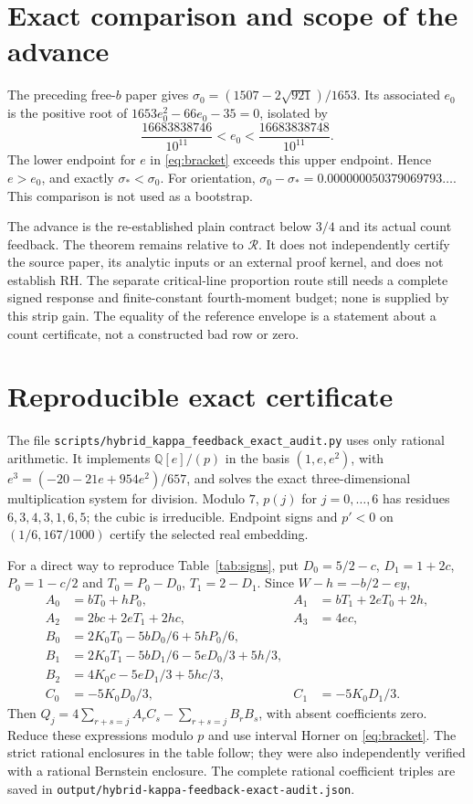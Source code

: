 \documentclass[11pt,a4paper]{article}
\theoremstyle{definition}
\newcommand{\sig}{\sigma_*}
\newcommand{\src}[1]{\nolinkurl{#1}}
\begin{document}
\section{Exact comparison and scope of the advance}
The preceding free-$b$ paper gives
$\sigma_0=(1507-2\sqrt{921})/1653$.
Its associated $e_0$ is the positive root of
$1653e_0^2-66e_0-35=0$, isolated by
\[
 \frac{16683838746}{10^{11}}<e_0<
 \frac{16683838748}{10^{11}}.
\]
The lower endpoint for $e$ in \eqref{eq:bracket} exceeds
this upper endpoint. Hence $e>e_0$, and exactly
$\sig<\sigma_0$.
For orientation,
$\sigma_0-\sig=0.000000050379069793\ldots$.
This comparison is not used as a bootstrap.

The advance is the re-established plain contract below $3/4$
and its actual count feedback. The theorem remains relative
to $\mathcal R$. It does not independently certify the source
paper, its analytic inputs or an external proof kernel, and
does not establish RH. The separate critical-line proportion
route still needs a complete signed response and finite-constant
fourth-moment budget; none is supplied by this strip gain.
The equality of the reference envelope is a statement about a
count certificate, not a constructed bad row or zero.

\appendix
\section{Reproducible exact certificate}
\label{app:audit}
The file \src{scripts/hybrid_kappa_feedback_exact_audit.py}
uses only rational arithmetic. It implements
$\mathbb Q[e]/(p)$ in the basis $(1,e,e^2)$, with
$e^3=(-20-21e+954e^2)/657$, and solves the exact three-dimensional
multiplication system for division.
Modulo $7$, $p(j)$ for $j=0,\ldots,6$ has residues
$6,3,4,3,1,6,5$; the cubic is irreducible.
Endpoint signs and $p'<0$ on $(1/6,167/1000)$ certify the
selected real embedding.

For a direct way to reproduce Table~\ref{tab:signs}, put
$D_0=5/2-c$, $D_1=1+2c$, $P_0=1-c/2$ and
$T_0=P_0-D_0$, $T_1=2-D_1$. Since $W-h=-b/2-ey$,
\begin{align*}
 A_0&=bT_0+hP_0,& A_1&=bT_1+2eT_0+2h,\\
 A_2&=2bc+2eT_1+2hc,& A_3&=4ec,\\
 B_0&=2K_0T_0-5bD_0/6+5hP_0/6,\\
 B_1&=2K_0T_1-5bD_1/6-5eD_0/3+5h/3,\\
 B_2&=4K_0c-5eD_1/3+5hc/3,\\
 C_0&=-5K_0D_0/3,& C_1&=-5K_0D_1/3.
\end{align*}
Then $Q_j=4\sum_{r+s=j}A_rC_s-\sum_{r+s=j}B_rB_s$,
with absent coefficients zero. Reduce these expressions modulo
$p$ and use interval Horner on \eqref{eq:bracket}.
The strict rational enclosures in the table follow; they were
also independently verified with a rational Bernstein enclosure.
The complete rational coefficient triples are saved in
\src{output/hybrid-kappa-feedback-exact-audit.json}.
\end{document}
